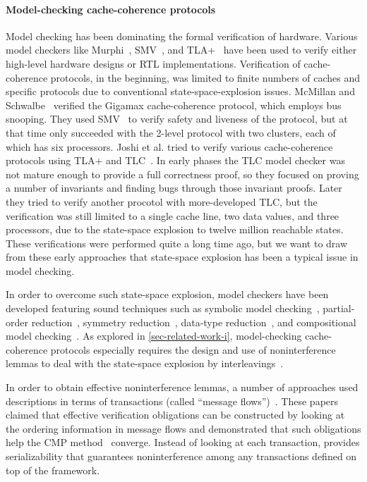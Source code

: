 \paragraph{Model-checking cache-coherence protocols}

Model checking has been dominating the formal verification of hardware.
Various model checkers like Murphi~\cite{murphi:Dill:1996,murphi:Dill:1992}, SMV~\cite{smv:McMillan:1993,smv:Jhala:2001}, and TLA+~\cite{tla:Lamport:2002} have been used to verify either high-level hardware designs or RTL implementations.
Verification of cache-coherence protocols, in the beginning, was limited to finite numbers of caches and specific protocols due to conventional state-space-explosion issues.
McMillan and Schwalbe~\cite{McMillan:1992} verified the Gigamax cache-coherence protocol, which employs bus snooping.
They used SMV~\cite{smv:McMillan:1993,smv:Jhala:2001} to verify safety and liveness of the protocol, but at that time only succeeded with the 2-level protocol with two clusters, each of which has six processors.
Joshi et al. tried to verify various cache-coherence protocols using TLA+ and TLC~\cite{tla:Lamport:2002}.
In early phases the TLC model checker was not mature enough to provide a full correctness proof, so they focused on proving a number of invariants and finding bugs through those invariant proofs.
Later they tried to verify another procotol with more-developed TLC, but the verification was still limited to a single cache line, two data values, and three processors, due to the state-space explosion to twelve million reachable states.
These verifications were performed quite a long time ago, but we want to draw from these early approaches that state-space explosion has been a typical issue in model checking.

In order to overcome such state-space explosion, model checkers have been developed featuring sound techniques such as symbolic model checking~\cite{smv:McMillan:1993}, partial-order reduction~\cite{Bhattacharya:2005}, symmetry reduction~\cite{Bhattacharya:2006,thesis:Ip:1996}, data-type reduction~\cite{McMillan:1999}, and compositional model checking~\cite{McMillan:1999}.
As explored in \autoref{sec-related-work-i}, model-checking cache-coherence protocols especially requires the design and use of noninterference lemmas to deal with the state-space explosion by interleavings~\cite{McMillan:1999,McMillan:2001,Chou:2004}.

In order to obtain effective noninterference lemmas, a number of approaches used descriptions in terms of transactions (called ``message flows'')~\cite{flow:Talupur:2008,flow:OLeary:2009,flow:Sethi:2014}.
These papers claimed that effective verification obligations can be constructed by looking at the ordering information in message flows and demonstrated that such obligations help the CMP method~\cite{McMillan:2001,Chou:2004} converge.
Instead of looking at each transaction, \hemiola{} provides serializability that guarantees noninterference among any transactions defined on top of the framework.


